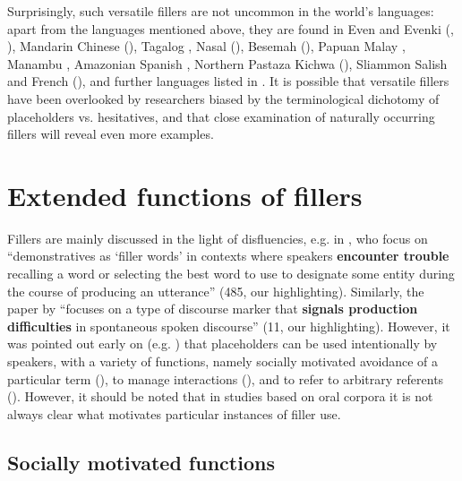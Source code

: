 \documentclass[output=paper]{langscibook}
\begin{document}
Surprisingly, such versatile fillers are not uncommon in the world’s languages: apart from the languages mentioned above, they are found in Even and Evenki (\citealt{Matić2008}, \citealt{Klyachko2022}), Mandarin Chinese (\citealt{Hayashi2006}), Tagalog \citep{Nagaya2022}, Nasal (\citealt{chapters/billings_mcdonnell}), Besemah (\citealt{chapters/mcdonnell_billings}), Papuan Malay \citep[388--389]{Kluge2017}, Manambu \citep[573--574]{Aikhenvald2008}, Amazonian Spanish \citep{Vallejos-yopan2023}, Northern Pastaza Kichwa (\citealt{chapters/rice}), Sliammon Salish \citep{Watanabe2010} and French (\citealt{Hennecke2022}), and further languages listed in \citet{Seraku2025}. It is possible that versatile fillers have been overlooked by researchers biased by the terminological dichotomy of placeholders vs. hesitatives, and that close examination of naturally occurring fillers will reveal even more examples.

\section{Extended functions of fillers}\label{sec:intro:5}

Fillers are mainly discussed in the light of disfluencies, e.g. in \citet{Hayashi2006}, who focus on “demonstratives as ‘filler words’ in contexts where speakers \textbf{encounter trouble} recalling a word or selecting the best word to use to designate some entity during the course of producing an utterance” (485, our highlighting). Similarly, the paper by \citet{Podlesskaya2010} “focuses on a type of discourse marker that \textbf{signals production difficulties} in spontaneous spoken discourse” (11, our highlighting). However, it was pointed out early on (e.g. \citealt{Enfield2003}) that placeholders can be used intentionally by speakers, with a variety of functions, namely socially motivated avoidance of a particular term (), to manage interactions (), and to refer to arbitrary referents (). However, it should be noted that in studies based on oral corpora it is not always clear what motivates particular instances of filler use. 

\subsection{Socially motivated functions}\label{sec:intro:5.1}
\end{document}

